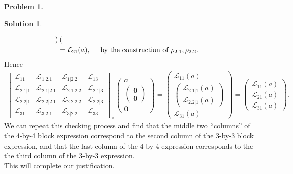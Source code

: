 \documentclass{book}
\theoremstyle{definition}
\newtheorem*{prob*}{Problem}
\newtheorem*{sln*}{Solution}
\newcommand{\lag}{\mathcal{L}}
\begin{document}
\begin{prob*}
\begin{sln*}
\begin{enumerate}
\begin{align*}
\begin{pmatrix}
		\end{pmatrix}\\
		&= \lag_{21}(a), \hspace{0.5cm}\text{by the construction of }\rho_{2.1}, \rho_{2.2}.
		\end{align*}
		Hence
		\begin{align*}
		\begin{bmatrix}
		\lag_{11} & \lag_{1|2.1} & \lag_{1|2.2} & \lag_{13}\\
		\lag_{2.1|1} & \lag_{2.1|2.1} & \lag_{2.1|2.2} & \lag_{2.1|3}\\
		\lag_{2.2|1} & \lag_{2.2|2.1} & \lag_{2.2|2.2} & \lag_{2.2|3}\\
		\lag_{31} & \lag_{3|2.1} & \lag_{3|2.2} & \lag_{33}
		\end{bmatrix}_\times \begin{pmatrix}
		a \\ \begin{pmatrix}
		\mathbf{0}\\\mathbf{0}
		\end{pmatrix}\\
		\mathbf{0}
		\end{pmatrix} = \begin{pmatrix}
		\lag_{11}(a)\\
		\begin{pmatrix}
		\lag_{2.1|1}(a)\\
		\lag_{2.2|1}(a)
		\end{pmatrix}\\
		\lag_{31}(a)
		\end{pmatrix} = \begin{pmatrix}
		\lag_{11}(a)\\
		\lag_{21}(a)\\
		\lag_{31}(a)
		\end{pmatrix}.
		\end{align*}
		We can repeat this checking process and find that the middle two ``columns'' of the 4-by-4 block expression correspond to the second column of the 3-by-3 block expression, and that the last column of the 4-by-4 expression corresponds to the the third column of the 3-by-3 expression.\\

		This will complete our justification.\\ 
		
		
		
		
		

\end{enumerate}
\end{sln*}
\end{prob*}
\end{document}
